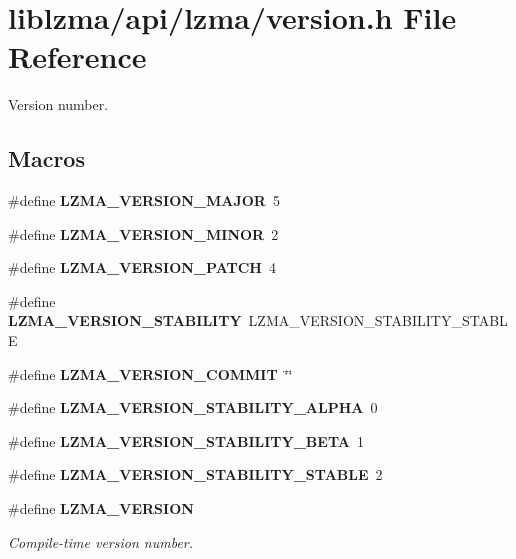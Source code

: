\section{liblzma/api/lzma/version.h File Reference}
\label{version_8h}


Version number.  


\subsection*{Macros}
\begin{DoxyCompactItemize}
\item 
\mbox{\label{version_8h_aa0f450c9d3b0ff5f88b55888ed55701f}} 
\#define {\bfseries L\+Z\+M\+A\+\_\+\+V\+E\+R\+S\+I\+O\+N\+\_\+\+M\+A\+J\+OR}~5
\item 
\mbox{\label{version_8h_af8fd295cf8aa349b0731423ad7a56134}} 
\#define {\bfseries L\+Z\+M\+A\+\_\+\+V\+E\+R\+S\+I\+O\+N\+\_\+\+M\+I\+N\+OR}~2
\item 
\mbox{\label{version_8h_a8b550373cbff381f15d4308b852a3c2a}} 
\#define {\bfseries L\+Z\+M\+A\+\_\+\+V\+E\+R\+S\+I\+O\+N\+\_\+\+P\+A\+T\+CH}~4
\item 
\mbox{\label{version_8h_ae289abe5dcc203c7cda9f6a9a2f36b3a}} 
\#define {\bfseries L\+Z\+M\+A\+\_\+\+V\+E\+R\+S\+I\+O\+N\+\_\+\+S\+T\+A\+B\+I\+L\+I\+TY}~L\+Z\+M\+A\+\_\+\+V\+E\+R\+S\+I\+O\+N\+\_\+\+S\+T\+A\+B\+I\+L\+I\+T\+Y\+\_\+\+S\+T\+A\+B\+LE
\item 
\mbox{\label{version_8h_a7fd6169ff15ac7f01f94970359a331ea}} 
\#define {\bfseries L\+Z\+M\+A\+\_\+\+V\+E\+R\+S\+I\+O\+N\+\_\+\+C\+O\+M\+M\+IT}~\char`\"{}\char`\"{}
\item 
\mbox{\label{version_8h_a5bc145ed7d9149eadb77e547ae8f1c5f}} 
\#define {\bfseries L\+Z\+M\+A\+\_\+\+V\+E\+R\+S\+I\+O\+N\+\_\+\+S\+T\+A\+B\+I\+L\+I\+T\+Y\+\_\+\+A\+L\+P\+HA}~0
\item 
\mbox{\label{version_8h_ad53a96c53713062b4380f01fb115cd48}} 
\#define {\bfseries L\+Z\+M\+A\+\_\+\+V\+E\+R\+S\+I\+O\+N\+\_\+\+S\+T\+A\+B\+I\+L\+I\+T\+Y\+\_\+\+B\+E\+TA}~1
\item 
\mbox{\label{version_8h_a97f7ed9e90264388614837baf97a4d3b}} 
\#define {\bfseries L\+Z\+M\+A\+\_\+\+V\+E\+R\+S\+I\+O\+N\+\_\+\+S\+T\+A\+B\+I\+L\+I\+T\+Y\+\_\+\+S\+T\+A\+B\+LE}~2
\item 
\#define \textbf{ L\+Z\+M\+A\+\_\+\+V\+E\+R\+S\+I\+ON}
\begin{DoxyCompactList}\small\item\em Compile-\/time version number. \end{DoxyCompactList}\item 

\end{DoxyCompactItemize}
